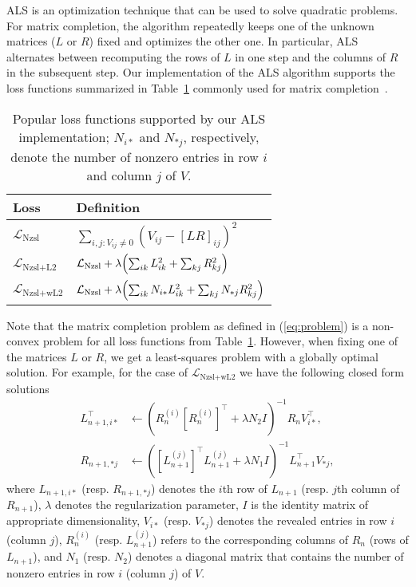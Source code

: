  ALS is an optimization technique that can be used to solve quadratic problems. 
 For matrix completion, the algorithm repeatedly keeps one of the unknown matrices ($L$ or $R$) fixed and optimizes the other one. In particular, ALS alternates between recomputing the rows of $L$ in one step and the columns of $R$ in the subsequent step.  
 Our implementation of the ALS algorithm supports the loss functions summarized in Table~\ref{tab:loss_functions} commonly used for matrix completion~\cite{ZhouWSP08:als}. 
 \begin{table}[t]
 	\centering
 	\label{tab:loss_functions}
 	\begin{tabular}{|ll|} \hline
 		Loss & Definition \\ \hline
 		$\mathcal{L}_\text{Nzsl}$ & $\sum_{i,j:V_{ij}\neq 0} (V_{ij} - [LR]_{ij})^2$ \\
 		$\mathcal{L}_\text{Nzsl+L2}$ & $\mathcal{L}_\text{Nzsl} + \lambda \Bigl( \sum_{ik} L_{ik}^2 + \sum_{kj} R_{kj}^2 \Bigr)$ \\
 		$\mathcal{L}_\text{Nzsl+wL2}$ & $\mathcal{L}_\text{Nzsl} + \lambda \Bigl(\sum_{ik}N_{i*} L_{ik}^2 + \sum_{kj}N_{*j} R_{kj}^2 \Bigr)$ \\ \hline 
 	\end{tabular}
 	\caption{Popular loss functions supported by our ALS implementation; $N_{i*}$ and $N_{*j}$, respectively, denote the number of nonzero entries in row $i$ and column $j$ of $V$.}
 \end{table}
 
 Note that the matrix completion problem as defined in (\ref{eq:problem}) is a non-convex problem for all loss functions from Table~\ref{tab:loss_functions}. 
 However, when fixing one of the matrices $L$ or $R$, we get a least-squares problem with a globally optimal solution.  
 For example, for the case of $\mathcal{L}_\text{Nzsl+wL2}$ we have the following closed form solutions
  \begin{align*}
  L^\top_{n+1,i*} &\leftarrow (R^{(i)}_n {[R^{(i)}_n]}^\top + \lambda N_2 I)^{-1} R_n V^\top_{i*}, \\
  R_{n+1,*j} &\leftarrow ({[L^{(j)}_{n+1}]}^\top L^{(j)}_{n+1} + \lambda N_1 I)^{-1} L^\top_{n+1} V_{*j}, 
  \end{align*}
 where $L_{n+1,i*}$ (resp. $R_{n+1,*j}$) denotes the $i$th row of $L_{n+1}$ (resp. $j$th column of $R_{n+1}$), $\lambda$ denotes 
 the regularization parameter, $I$ is the identity matrix of appropriate dimensionality, 
 $V_{i*}$ (resp. $V_{*j}$) denotes the revealed entries in row $i$ (column $j$), 
 $R^{(i)}_n$ (resp. $L^{(j)}_{n+1}$) refers to the corresponding columns of $R_n$ (rows of $L_{n+1}$), 
 and $N_1$ (resp. $N_2$) denotes a diagonal matrix that contains the number of nonzero entries in row $i$ (column $j$) of $V$.   
 
